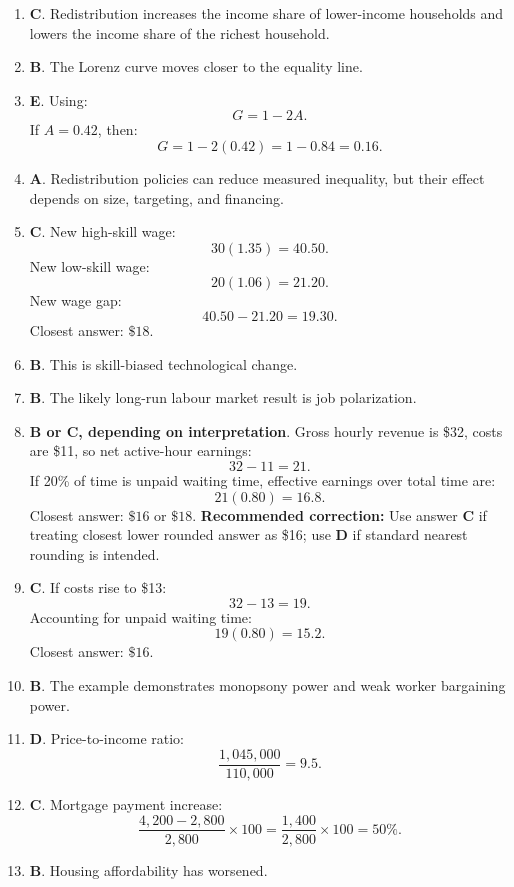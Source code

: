 \documentclass[12pt]{article}
\begin{document}
\begin{enumerate}
\item \textbf{C}. Redistribution increases the income share of lower-income households and lowers the income share of the richest household.

\item \textbf{B}. The Lorenz curve moves closer to the equality line.

\item \textbf{E}. Using:
\[
G=1-2A.
\]
If \(A=0.42\), then:
\[
G=1-2(0.42)=1-0.84=0.16.
\]

\item \textbf{A}. Redistribution policies can reduce measured inequality, but their effect depends on size, targeting, and financing.

\item \textbf{C}. New high-skill wage:
\[
30(1.35)=40.50.
\]
New low-skill wage:
\[
20(1.06)=21.20.
\]
New wage gap:
\[
40.50-21.20=19.30.
\]
Closest answer: \(\$18\).

\item \textbf{B}. This is skill-biased technological change.

\item \textbf{B}. The likely long-run labour market result is job polarization.

\item \textbf{B or C, depending on interpretation}. Gross hourly revenue is \$32, costs are \$11, so net active-hour earnings:
\[
32-11=21.
\]
If 20\% of time is unpaid waiting time, effective earnings over total time are:
\[
21(0.80)=16.8.
\]
Closest answer: \(\$16\) or \(\$18\).  
\textbf{Recommended correction:} Use answer \textbf{C} if treating closest lower rounded answer as \$16; use \textbf{D} if standard nearest rounding is intended.

\item \textbf{C}. If costs rise to \$13:
\[
32-13=19.
\]
Accounting for unpaid waiting time:
\[
19(0.80)=15.2.
\]
Closest answer: \(\$16\).

\item \textbf{B}. The example demonstrates monopsony power and weak worker bargaining power.

\item \textbf{D}. Price-to-income ratio:
\[
\frac{1,045,000}{110,000}=9.5.
\]

\item \textbf{C}. Mortgage payment increase:
\[
\frac{4,200-2,800}{2,800}\times100
=\frac{1,400}{2,800}\times100=50\%.
\]

\item \textbf{B}. Housing affordability has worsened.


\end{enumerate}
\end{document}
